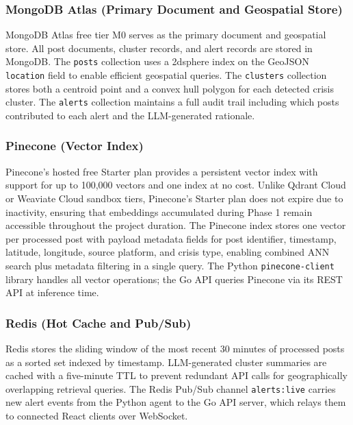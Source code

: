 \documentclass[conference]{IEEEtran}
\begin{document}
\subsubsection{MongoDB Atlas (Primary Document and Geospatial Store)}

MongoDB Atlas free tier M0 serves as the primary document and geospatial store.
All post documents, cluster records, and alert records are stored in MongoDB.
The \texttt{posts} collection uses a 2dsphere index on the GeoJSON
\texttt{location} field to enable efficient geospatial queries. The
\texttt{clusters} collection stores both a centroid point and a convex hull
polygon for each detected crisis cluster. The \texttt{alerts} collection
maintains a full audit trail including which posts contributed to each alert
and the LLM-generated rationale.

\subsubsection{Pinecone (Vector Index)}

Pinecone's hosted free Starter plan provides a persistent vector index with
support for up to 100,000 vectors and one index at no cost. Unlike Qdrant Cloud
or Weaviate Cloud sandbox tiers, Pinecone's Starter plan does not expire
due to inactivity, ensuring that embeddings accumulated during Phase 1 remain
accessible throughout the project duration. The Pinecone index stores one vector
per processed post with payload metadata fields for post identifier, timestamp,
latitude, longitude, source platform, and crisis type, enabling combined ANN
search plus metadata filtering in a single query. The Python
\texttt{pinecone-client} library handles all vector operations; the Go API
queries Pinecone via its REST API at inference time.

\subsubsection{Redis (Hot Cache and Pub/Sub)}

Redis stores the sliding window of the most recent 30 minutes of processed
posts as a sorted set indexed by timestamp. LLM-generated cluster summaries
are cached with a five-minute TTL to prevent redundant API calls for
geographically overlapping retrieval queries. The Redis Pub/Sub channel
\texttt{alerts:live} carries new alert events from the Python agent to the Go
API server, which relays them to connected React clients over WebSocket.
\end{document}
